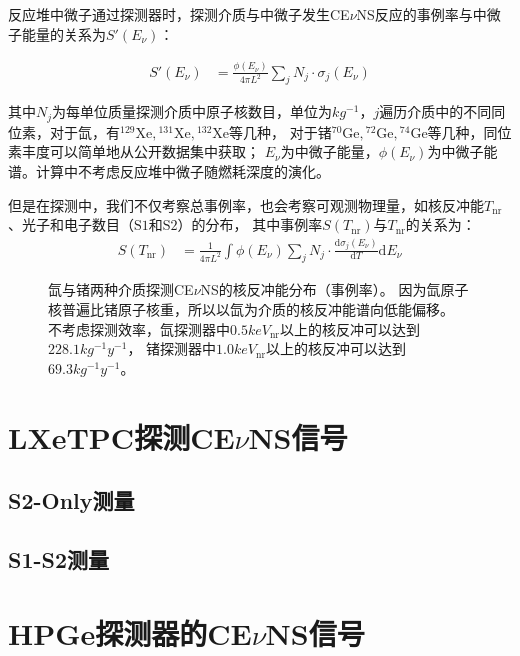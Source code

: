 反应堆中微子通过探测器时，探测介质与中微子发生CE$\nu$NS反应的事例率与中微子能量的关系为$S'(E_\nu)$：

\begin{align}
    \label{eq:sevent_rate}
    S'(E_\nu) &= \frac{\phi(E_\nu)}{4\pi L^2}\sum_j N_j\cdot \sigma_j(E_\nu)
\end{align}

其中$N_j$为每单位质量探测介质中原子核数目，单位为$\si{kg^{-1}}$，$j$遍历介质中的不同同位素，对于氙，有${}^{129}\mathrm{Xe},{}^{131}\mathrm{Xe},{}^{132}\mathrm{Xe}$等几种，
对于锗${}^{70}\mathrm{Ge},{}^{72}\mathrm{Ge},{}^{74}\mathrm{Ge}$等几种，同位素丰度可以简单地从公开数据集中获取；
$E_\nu$为中微子能量，$\phi(E_\nu)$为中微子能谱。计算中不考虑反应堆中微子随燃耗深度的演化。

但是在探测中，我们不仅考察总事例率，也会考察可观测物理量，如核反冲能$T_{\mathrm{nr}}$、光子和电子数目（$\mathrm{S1}$和$\mathrm{S2}$）的分布，
其中事例率$S(T_{\mathrm{nr}})$与$T_{\mathrm{nr}}$的关系为：
\begin{align}
    \label{eq:tnr_event_rate}
    S(T_{\mathrm{nr}}) &= \frac{1}{4\pi L^2}\int\phi(E_\nu)\sum_j N_j\cdot \frac{\mathrm{d}\sigma_j(E_\nu)}{\mathrm{d}T}\mathrm{d}E_\nu
\end{align}

\begin{figure}
    \centering
    
    \caption{\label{fig:cevns_event_rate} 氙与锗两种介质探测CE$\nu$NS的核反冲能分布（事例率）。
    因为氙原子核普遍比锗原子核重，所以以氙为介质的核反冲能谱向低能偏移。
    不考虑探测效率，氙探测器中$0.5\si{keV_{\mathrm{nr}}}$以上的核反冲可以达到$228.1\si{kg^{-1}y^{-1}}$，
    锗探测器中$1.0\si{keV_{\mathrm{nr}}}$以上的核反冲可以达到$69.3\si{kg^{-1}y^{-1}}$。}
\end{figure}

\section{LXeTPC探测CE$\nu$NS信号}
\label{sec:lxe_signal}

\subsection{S2-Only测量}

\subsection{S1-S2测量}

\section{HPGe探测器的CE$\nu$NS信号}
